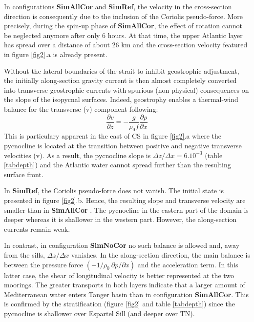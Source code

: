 \documentclass[a4paper,12pt]{article}
\begin{document}
In configurations \textbf{SimAllCor} and \textbf{SimRef}, the velocity in the cross-section direction is consequently due to the inclusion of the Coriolis pseudo-force. More precisely, during the spin-up phase of \textbf{SimAllCor}, the effect of rotation cannot be neglected anymore after only 6 hours. At that time, the upper Atlantic layer has spread over a distance of about 26 km and the cross-section velocity featured in figure \ref{fig2}.a is already present.

Without the lateral boundaries of the strait to inhibit geostrophic adjustment, the initially along-section gravity current is then almost completely converted into transverse geostrophic currents with spurious (non physical) consequences on the slope of the isopycnal surfaces. Indeed, geostrophy enables a thermal-wind balance for the transverse (v) component following: 
\begin{equation}  
    \label{Thermal_wind}
    \displaystyle   
	\frac{\partial v}{\partial z}
    =-\frac{g}{\rho_0 f} \frac{\partial \rho}{\partial x}
\end{equation}
This is particulary apparent in the east of CS in figure \ref{fig2}.a where the pycnocline is located at the transition between positive and negative transverse velocities (v). As a result, the pycnocline slope is $\Delta z/\Delta x = 6.10^{-3}$ (table \ref{tabdepth}) and the Atlantic water cannot spread further than the resulting surface front.

In \textbf{SimRef}, the Coriolis pseudo-force does not vanish. The initial state is presented in figure \ref{fig2}.b. Hence, the resulting slope and transverse velocity are smaller than in \textbf{SimAllCor}%
. The pycnocline in the eastern part of the domain is deeper whereas it is shallower in the western part. However, the along-section currents remain weak.

In contrast, in configuration \textbf{SimNoCor} no such balance is allowed and, away from the sills, $\Delta z/\Delta x$ vanishes. In the along-section direction, the main balance is between the pressure force $(-1/\rho_0\  \partial p/\partial x)$ and the acceleration term. In this latter case, the shear of longitudinal velocity is better represented at the two moorings. The greater transports in both layers indicate that a larger amount of Mediterranean water enters Tanger basin than in configuration \textbf{SimAllCor}. This is confirmed by the stratification (figure \ref{fig2} and table \ref{tabdepth}) since the pycnocline is shallower over Espartel Sill (and deeper over TN).
\end{document}
